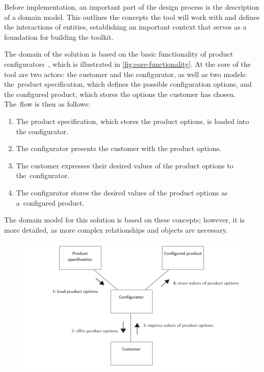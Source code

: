 Before implementation, an important part of the design process is the description of a domain model. This outlines the concepts the tool will work with and defines the interactions of entities, establishing an important context that serves as a foundation for building the toolkit. 

The domain of the solution is based on the basic functionality of product configurators~\cite{Hansen2003}, which is illustrated in \autoref{fig:core-functionality}. At the core of the tool are two actors: the customer and the configurator, as well as two models: the~product specification, which defines the possible configuration options, and the configured product, which stores the options the customer has chosen. The~flow is then as follows:
\begin{enumerate}
    \item The product specification, which stores the product options, is loaded into the configurator.
    \item The configurator presents the customer with the product options.
    \item The customer expresses their desired values of the product options to the~configurator.
    \item The configurator stores the desired values of the product options as a~configured product.
\end{enumerate}
The domain model for this solution is based on these concepts; however, it is more detailed, as more complex relationships and objects are necessary.

\begin{figure}[h]
\centering
\includegraphics[width=\textwidth]{images/diagram_communication.png}
\label{fig:core-functionality}
\end{figure}



